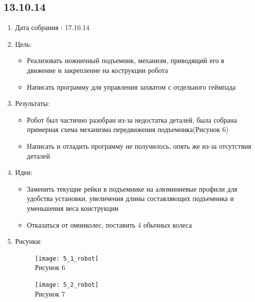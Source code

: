 \documentclass[11pt]{article}
\begin{document}
	\subsection{13.10.14}
	\begin{enumerate}
		\item Дата собрания : 17.10.14
		\item Цель:
		\begin{itemize}
			\item Реализовать ножничный подъемник, механизм, приводящий его в движение и закрепление на кострукции робота
			\item Написать программу для управления захватом с отдельного геймпада
		\end{itemize}
		\item Результаты:
		\begin{itemize}
			\item Робот был частично разобран из-за недостатка деталей, была собрана примерная схема механизма передвижения подъемника(Рисунок 6)
			\item Написать и отладить программу не получилось, опять же из-за отсутствия деталей
		\end{itemize}
		\item Идеи:
		\begin{itemize}
			\item Заменить текущие рейки в подъемнике на алюминиевые профили для удобства установки, увеличения длины составляющих подъемника и уменьшения веса конструкции
			\item Отказаться от омниколес, поставить 4 обычных колеса
		\end{itemize}
		\item Рисунки:
		\begin{figure} [h]
			\centering
			\begin{minipage}{0.3\linewidth}
				\texttt{[image: 5\_1\_robot]}\\ Рисунок 6
			\end{minipage}
			\begin{minipage}{0.3\linewidth}
				\texttt{[image: 5\_2\_robot]}\\ Рисунок 7
			\end{minipage}
		\end{figure}
	\end{enumerate}

	
\end{document}
